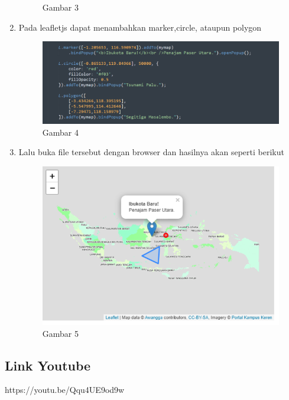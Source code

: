 \begin{enumerate}
\begin{figure}[H]
		\centering
		\caption{Gambar 3}
	\end{figure}
    \item Pada leafletjs dapat menambahkan marker,circle, ataupun polygon 
    \hfill\break
    \begin{figure}[H]
		\includegraphics[width=12cm]{figures/Tugas5/1174086/5.png}
		\centering
		\caption{Gambar 4}
	\end{figure}
    \item Lalu buka file tersebut dengan browser dan hasilnya akan seperti berikut
    \hfill\break
    \begin{figure}[H]
		\includegraphics[width=12cm]{figures/Tugas5/1174086/6.png}
		\centering
		\caption{Gambar 5}
	\end{figure}
\end{enumerate}
\subsection{Link Youtube}
https://youtu.be/Qqu4UE9od9w